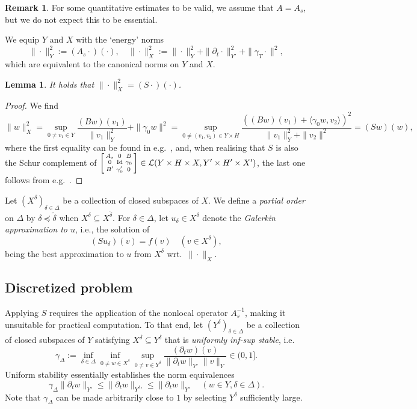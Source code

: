 \documentclass[11pt,a4paper,oneside,english]{amsart}
\numberwithin{equation}{section}
\numberwithin{theorem}{section}
\newtheorem{lemma}[theorem]{Lemma}
\theoremstyle{definition}
\newtheorem{remark}[theorem]{Remark}
\newcommand{\la}{\langle}
\newcommand{\ra}{\rangle}
\DeclareMathOperator*{\Id}{Id}
\newcommand{\cL}{\mathcal L}
\newcommand{\jw}[1]{{\color{red}{JW: #1}}}
\begin{document}
\begin{remark}
  For some quantitative estimates to be valid, we assume that $A=A_s$, but we do not expect this to be essential.
\end{remark}
We equip $Y$ and $X$ with the `energy' norms
$$
\|\cdot\|_Y^2:=(A_s\cdot)(\cdot),\quad \|\cdot\|_X^2:=\|\cdot\|_Y^2+\|\partial_t \cdot\|_{Y'}^2+\|\gamma_T \cdot\|^2,
$$
which are equivalent to the canonical norms on $Y$ and $X$.

\begin{lemma}
  \label{lem:energy-norm}
  It holds that $\|\cdot\|_X^2=(S\cdot)(\cdot)$.
\end{lemma}
\begin{proof} 
  We find \jw{dit ben ik nog niet nagegaan}
  \[
    \|w\|_X^2=\sup_{0 \neq v_1 \in Y} \frac{(B w)(v_1)}{\|v_1\|_Y^2}+\|\gamma_0 w\|^2
    =\sup_{0 \neq (v_1,v_2) \in Y \times H} \frac{((B w)(v_1)+\la \gamma_0 w,v_2\ra)^2}{\|v_1\|_Y^2+\|v_2\|^2} =(Sw)(w),
  \]
  where the first equality can be found in e.g.~\cite[Thm.~2.1]{Ern2017a}, and,
  when realising that $S$ is also the Schur complement of 
  $\begin{bsmallmatrix} A_s & 0 & B\\ 0 & \Id & \gamma_0\\ B' & \gamma_0' & 0\end{bsmallmatrix} \in \cL(Y\times H \times X, Y'\times H'\times X')$, the last one follows from e.g.~\cite[Lemma~2.2]{Kondratyuk2008}.
\end{proof}

Let $(X^\delta)_{\delta \in \Delta}$ be a collection of closed subspaces of $X$. 
We define a \emph{partial order} on $\Delta$ by $\delta \preceq \tilde{\delta}$
when $X^\delta \subseteq X^{\tilde{\delta}}$. For $\delta \in \Delta$, let
$u_\delta \in X^\delta$ denote the {\em Galerkin approximation to $u$}, i.e., the solution of
\begin{equation}
(Su_\delta)(v)=f(v) \quad (v \in X^\delta), 
  \label{eqn:galerkin}
\end{equation}
being the best approximation to $u$ from $X^\delta$ wrt.~$\|\cdot\|_X$.

\subsection{Discretized problem}
Applying $S$ requires the application of the nonlocal operator $A_s^{-1}$, making it
unsuitable for practical computation. To that end, let $(Y^\delta)_{\delta \in \Delta}$
be a collection of closed subspaces of $Y$ satisfying $X^\delta \subseteq Y^\delta$
that is \emph{uniformly inf-sup stable}, i.e.
\begin{equation}
  \gamma_\Delta:=\inf_{\delta \in \Delta}\inf_{0 \neq w \in X^\delta}\sup_{0\neq v \in Y^\delta} \frac{(\partial_t w)(v)}{\|\partial_t w\|_{Y'}\|v\|_Y} \in (0,1].
  \label{eqn:infinfsup}
\end{equation}
Uniform stability essentially establishes the norm equivalences
\[
  \gamma_\Delta \|\partial_t w\|_{Y'} \leq \|\partial_t w\|_{{Y^\delta}'} \leq \|\partial_t w\|_{Y'} \quad (w \in Y, \delta \in \Delta).
\]
Note that $\gamma_\Delta$ can be made arbitrarily close to $1$ by selecting $Y^\delta$ sufficiently large.
\end{document}
